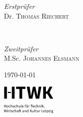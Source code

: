 \begin{titlepage}
		
		\vfill
		
		\begin{minipage}{0.4\textwidth}
			\begin{flushleft}
				\large
				\textit{Erstprüfer}\\
				Dr. \textsc{Thomas Riechert}
			\end{flushleft}
		\end{minipage}
		~
		\begin{minipage}{0.4\textwidth}
			\begin{flushright}
				\large
				\textit{Zweitprüfer}\\
				M.Sc. \textsc{Johannes Elsmann}
			\end{flushright}
		\end{minipage}
		
		
		
		\vfill\vfill\vfill %
		
		{\large\today} %
		
		
		\vfill\vfill
		\includegraphics[width=0.2\textwidth]{misc/HTWK_Zusatz_de_V_Black.jpg}\\[1cm] 
		
		
		\vfill %
		
	\end{titlepage}